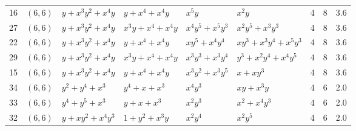 \begin{table}[t]
\begin{tabular*}{\textwidth}{@{\extracolsep{\fill}}cllllllcc}
16 & $(6,6)$ & $y{+}x^{3}y^{2}{+}x^{4}y$ & $y{+}x^{4}{+}x^{4}y$ & $x^{5}y$ & $x^{2}y$ & 4 & 8 & 3.6 \\
27 & $(6,6)$ & $y{+}x^{3}y^{2}{+}x^{4}y$ & $x^{3}y{+}x^{4}{+}x^{4}y$ & $x^{4}y^{5}{+}x^{5}y^{3}$ & $x^{2}y^{5}{+}x^{3}y^{3}$ & 4 & 8 & 3.6 \\
22 & $(6,6)$ & $y{+}x^{3}y^{2}{+}x^{4}y$ & $y{+}x^{4}{+}x^{4}y$ & $xy^{5}{+}x^{4}y^{4}$ & $xy^{3}{+}x^{3}y^{4}{+}x^{5}y^{3}$ & 4 & 8 & 3.6 \\
29 & $(6,6)$ & $y{+}x^{3}y^{2}{+}x^{4}y$ & $x^{3}y{+}x^{4}{+}x^{4}y$ & $x^{3}y^{3}{+}x^{3}y^{4}$ & $y^{3}{+}x^{2}y^{4}{+}x^{4}y^{5}$ & 4 & 8 & 3.6 \\
15 & $(6,6)$ & $y{+}x^{3}y^{2}{+}x^{4}y$ & $y{+}x^{4}{+}x^{4}y$ & $x^{3}y^{2}{+}x^{3}y^{5}$ & $x{+}xy^{3}$ & 4 & 8 & 3.6 \\
34 & $(6,6)$ & $y^{2}{+}y^{4}{+}x^{3}$ & $y^{4}{+}x{+}x^{3}$ & $x^{4}y^{3}$ & $xy{+}x^{3}y$ & 4 & 6 & 2.0 \\
33 & $(6,6)$ & $y^{4}{+}y^{5}{+}x^{3}$ & $y{+}x{+}x^{3}$ & $x^{2}y^{3}$ & $x^{2}{+}x^{4}y^{3}$ & 4 & 6 & 2.0 \\
32 & $(6,6)$ & $y{+}xy^{2}{+}x^{4}y^{3}$ & $1{+}y^{2}{+}x^{3}y$ & $x^{2}y^{4}$ & $x^{2}y^{5}$ & 4 & 6 & 2.0 \\
\bottomrule
\end{tabular*}
\end{table}

